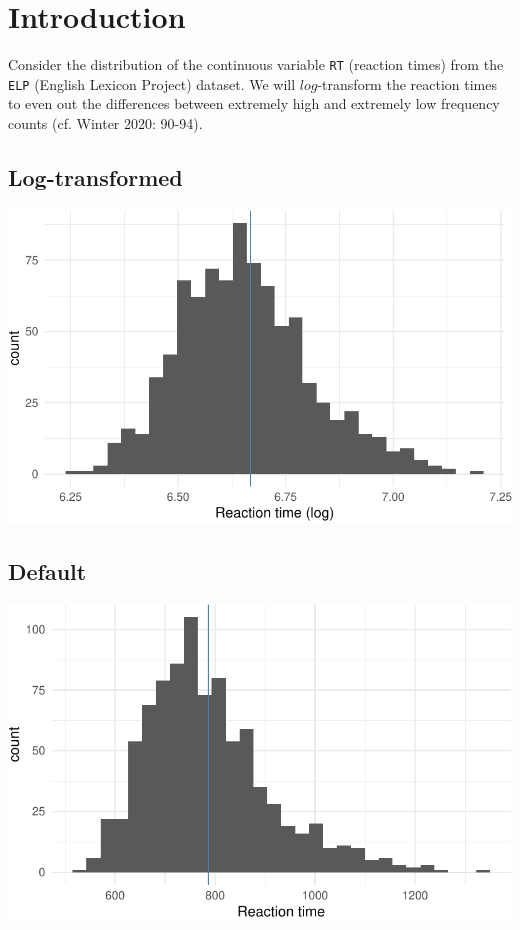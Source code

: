\documentclass[
  11pt,
  letterpaper,
  DIV=11,
  numbers=noendperiod]{scrreprt}
\begin{document}
\section{Introduction}\label{introduction}

Consider the distribution of the continuous variable \texttt{RT}
(reaction times) from the \texttt{ELP} (English Lexicon Project)
dataset. We will \(log\)-transform the reaction times to even out the
differences between extremely high and extremely low frequency counts
(cf. Winter 2020: 90-94).

\subsection{Log-transformed}

\includegraphics{Linear_regression_files/figure-pdf/unnamed-chunk-3-1.pdf}

\subsection{Default}

\includegraphics{Linear_regression_files/figure-pdf/unnamed-chunk-4-1.pdf}
\end{document}

